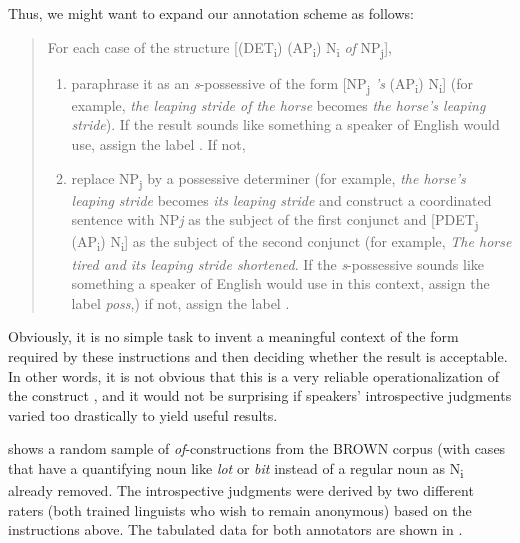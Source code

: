 Thus, we might want to expand our annotation scheme as follows:

\begin{quote}
For each case of the structure [(DET\textsubscript{i}) (AP\textsubscript{i}) N\textsubscript{i} \textit{of} NP\textsubscript{j}],
\begin{enumerate}
\item paraphrase it as an \textit{s}-possessive  of the form [NP\textsubscript{j} \textit{'s} (AP\textsubscript{i}) N\textsubscript{i}] (for example, \textit{the leaping stride of the horse} becomes \textit{the horse's leaping stride}). If the result sounds like something a speaker of English would use, assign the label . If not,
\item replace NP\textsubscript{j} by a possessive determiner  (for example, \textit{the horse's leaping stride} becomes \textit{its leaping stride} and construct a coordinated  sentence with NP\textit{j} as the subject of the first conjunct  and [PDET\textsubscript{j} (AP\textsubscript{i}) N\textsubscript{i}] as the subject of the second conjunct (for example, \textit{The horse tired and its leaping stride shortened}. If the \textit{s}-possessive  sounds like something a speaker of English would use in this context, assign the label \textit{poss},) if not, assign the label .
\end{enumerate}
\end{quote}

Obviously, it is no simple task to invent a meaningful  context of the form required by these instructions and then deciding whether the result is acceptable.  In other words, it is not obvious that this is a very reliable  operationalization  of the construct ,  and it would not be surprising if speakers' introspective  judgments varied too drastically to yield useful results.

  shows a random sample of \textit{of}-constructions from the BROWN  corpus (with cases that have a quantifying noun  like \textit{lot} or \textit{bit} instead of a regular noun as N\textsubscript{i} already removed. The introspective  judgments were derived by two different raters (both trained linguists who wish to remain anonymous) based on the instructions above. The tabulated data for both annotators  are shown in .

